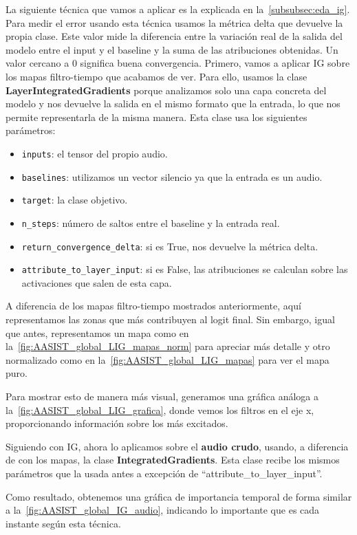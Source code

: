 La siguiente técnica que vamos a aplicar es la explicada en la~\autoref{subsubsec:eda_ig}. Para medir el error usando esta técnica usamos la métrica delta que devuelve la propia clase. Este valor mide la diferencia entre la variación real de la salida del modelo entre el input y el baseline y la suma de las atribuciones obtenidas. Un valor cercano a 0 significa buena convergencia.
Primero, vamos a aplicar IG sobre los mapas filtro-tiempo que acabamos de ver. Para ello, usamos la clase \textbf{LayerIntegratedGradients} porque analizamos solo una capa concreta del modelo y nos devuelve la salida en el mismo formato que la entrada, lo que nos permite representarla de la misma manera. Esta clase usa los siguientes parámetros:
\begin{itemize}
    \item \texttt{inputs}: el tensor del propio audio.
    \item \texttt{baselines}: utilizamos un vector silencio ya que la entrada es un audio.
    \item \texttt{target}: la clase objetivo.
    \item \texttt{n\_steps}: número de saltos entre el baseline y la entrada real.
    \item \texttt{return\_convergence\_delta}: si es True, nos devuelve la métrica delta.
    \item \texttt{attribute\_to\_layer\_input}: si es False, las atribuciones se calculan sobre las activaciones que salen de esta capa.
\end{itemize}

A diferencia de los mapas filtro-tiempo mostrados anteriormente, aquí representamos las zonas que más contribuyen al logit final.
Sin embargo, igual que antes, representamos un mapa como en la~\autoref{fig:AASIST_global_LIG_mapas_norm} para apreciar más detalle y otro normalizado como en la~\autoref{fig:AASIST_global_LIG_mapas} para ver el mapa puro.

Para mostrar esto de manera más visual, generamos una gráfica análoga a la~\autoref{fig:AASIST_global_LIG_grafica}, donde vemos los filtros en el eje x, proporcionando información sobre los más excitados.

Siguiendo con IG, ahora lo aplicamos sobre el \textbf{audio crudo}, usando, a diferencia de con los mapas, la clase \textbf{IntegratedGradients}. Esta clase recibe los mismos parámetros que la usada antes a excepción de ``attribute\_to\_layer\_input''.

Como resultado, obtenemos una gráfica de importancia temporal de forma similar a la~\autoref{fig:AASIST_global_IG_audio}, indicando lo importante que es cada instante según esta técnica.

